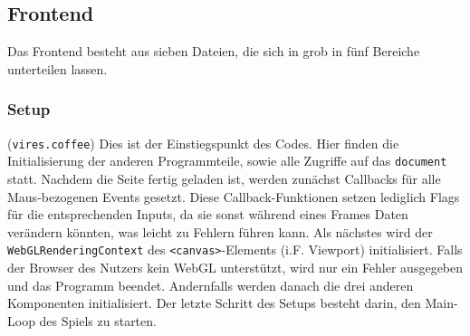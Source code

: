 \subsection{Frontend}
Das Frontend besteht aus sieben Dateien, die sich in grob in fünf Bereiche unterteilen lassen.

\subsubsection{Setup} (\verb+vires.coffee+)
Dies ist der Einstiegspunkt des Codes. Hier finden die Initialisierung der anderen Programmteile, sowie alle Zugriffe auf das \verb+document+ statt. 
Nachdem die Seite fertig geladen ist, werden zunächst Callbacks für alle Maus-bezogenen Events gesetzt. Diese Callback-Funktionen setzen lediglich Flags für die entsprechenden Inputs, da sie sonst während eines Frames Daten verändern könnten, was leicht zu Fehlern führen kann.
Als nächstes wird der \verb+WebGLRenderingContext+ des \verb+<canvas>+-Elements (i.F. Viewport) initialisiert. Falls der Browser des Nutzers kein WebGL unterstützt, wird nur ein Fehler ausgegeben und das Programm beendet. Andernfalls werden danach die drei anderen Komponenten initialisiert.
Der letzte Schritt des Setups besteht darin, den Main-Loop des Spiels zu starten.

